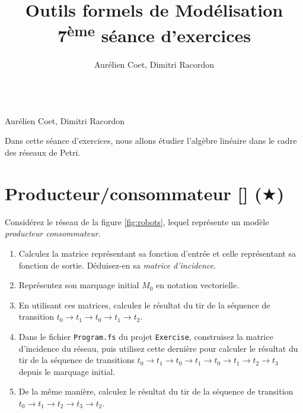 \documentclass[a4paper, titlepage]{article}
\makeatletter
\numberwithin{figure}{section}
\numberwithin{table}{section}
\newcommand\objective[1]{\def\@objective{#1}}
\newcommand{\makecustomtitle}{%
	\begin{center}
		\huge\@title \\
		[1ex]\small Aurélien Coet, Dimitri Racordon
	\end{center}
	\@objective
}
\makeatother
\begin{document}
\title{Outils formels de Modélisation \\ 7\textsuperscript{ème} séance d'exercices}
\author{Aurélien Coet, Dimitri Racordon}
\objective{
Dans cette séance d'exercices, nous allons étudier l'algèbre linéaire dans le cadre des réseaux de Petri.
}

\makecustomtitle

\section{Producteur/consommateur [\Keyboard] ($\bigstar$)}
Considérez le réseau de la figure \ref{fig:robots}, lequel représente un modèle \emph{producteur consommateur}.
\begin{enumerate}
  \item Calculez la matrice représentant sa fonction d'entrée et celle représentant sa fonction de sortie. Déduisez-en sa \emph{matrice d'incidence}.
  \item Représentez son marquage initial $M_0$ en notation vectorielle.
  \item En utilisant ces matrices, calculez le résultat du tir de la séquence de transition $t_0 \rightarrow t_1 \rightarrow t_0 \rightarrow t_1 \rightarrow t_2$.
  \item Dans le fichier \texttt{Program.fs} du projet \texttt{Exercise}, construisez la matrice d'incidence du réseau, puis utilisez cette dernière pour calculer le résultat du tir de la séquence de transitions $t_0 \rightarrow t_1 \rightarrow t_0 \rightarrow t_1 \rightarrow t_0 \rightarrow t_1 \rightarrow t_2 \rightarrow t_3$ depuis le marquage initial.
  \item De la même manière, calculez le résultat du tir de la séquence de transition $t_0 \rightarrow t_1 \rightarrow t_2 \rightarrow t_3 \rightarrow t_2$.
\end{enumerate}
\end{document}
